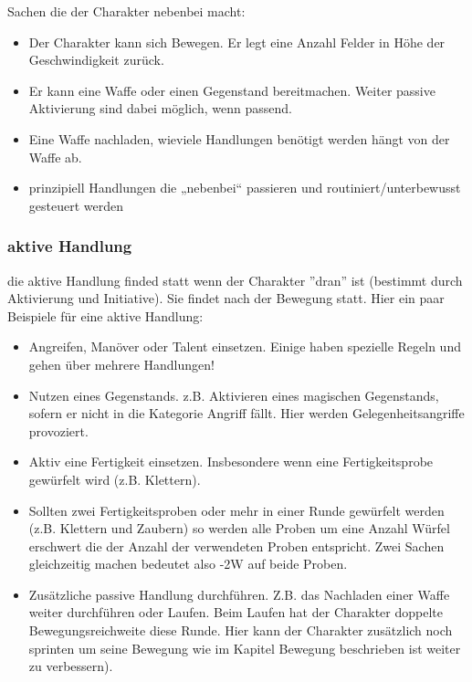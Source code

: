 \documentclass{article}
\begin{document}
Sachen die der Charakter nebenbei macht:

\begin{itemize}
\item Der Charakter kann sich Bewegen. Er legt eine Anzahl Felder in Höhe der Geschwindigkeit zurück.
\item Er kann eine Waffe oder einen Gegenstand bereitmachen. Weiter passive Aktivierung sind dabei möglich, wenn passend.
\item Eine Waffe nachladen, wieviele Handlungen benötigt werden hängt von der Waffe ab.
\item prinzipiell Handlungen die „nebenbei“ passieren und routiniert/unterbewusst gesteuert werden
\end{itemize}

\subsubsection{aktive Handlung}

die aktive Handlung finded statt wenn der Charakter ''dran'' ist (bestimmt durch Aktivierung und Initiative). Sie
findet nach der Bewegung statt. Hier ein paar Beispiele für eine aktive Handlung:

\begin{itemize}
\item Angreifen, Manöver oder Talent einsetzen. Einige haben spezielle Regeln und gehen über mehrere Handlungen!
\item Nutzen eines Gegenstands. z.B. Aktivieren eines magischen Gegenstands, sofern er nicht in die Kategorie Angriff fällt. Hier werden Gelegenheitsangriffe provoziert.
\item Aktiv eine Fertigkeit einsetzen. Insbesondere wenn eine Fertigkeitsprobe gewürfelt wird (z.B. Klettern).
\item Sollten zwei Fertigkeitsproben oder mehr in einer Runde gewürfelt werden (z.B. Klettern und Zaubern) so werden alle Proben um eine Anzahl Würfel erschwert die der Anzahl der verwendeten Proben entspricht. Zwei Sachen gleichzeitig machen bedeutet also -2W auf beide Proben.
\item Zusätzliche passive Handlung durchführen. Z.B. das Nachladen einer Waffe weiter durchführen oder Laufen. Beim Laufen hat der Charakter doppelte Bewegungsreichweite diese Runde. Hier kann der Charakter zusätzlich noch sprinten um seine Bewegung wie im Kapitel Bewegung beschrieben ist weiter zu verbessern).
\end{itemize}
\end{document}
